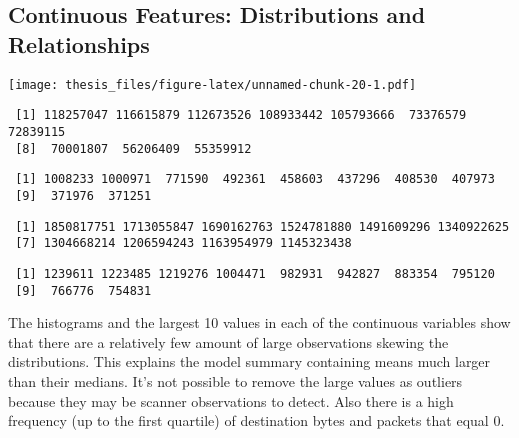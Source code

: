\documentclass[12pt,twoside]{dukestatscithesis}
\theoremstyle{definition}
\theoremstyle{definition}
\theoremstyle{definition}
\theoremstyle{remark}
\begin{document}
\subsection{Continuous Features: Distributions and
Relationships}\label{continuous-features-distributions-and-relationships}

\texttt{[image: thesis\_files/figure-latex/unnamed-chunk-20-1.pdf]}
\begin{verbatim}
 [1] 118257047 116615879 112673526 108933442 105793666  73376579  72839115
 [8]  70001807  56206409  55359912
\end{verbatim}
\begin{verbatim}
 [1] 1008233 1000971  771590  492361  458603  437296  408530  407973
 [9]  371976  371251
\end{verbatim}
\begin{verbatim}
 [1] 1850817751 1713055847 1690162763 1524781880 1491609296 1340922625
 [7] 1304668214 1206594243 1163954979 1145323438
\end{verbatim}
\begin{verbatim}
 [1] 1239611 1223485 1219276 1004471  982931  942827  883354  795120
 [9]  766776  754831
\end{verbatim}
The histograms and the largest 10 values in each of the continuous
variables show that there are a relatively few amount of large
observations skewing the distributions. This explains the model summary
containing means much larger than their medians. It's not possible to
remove the large values as outliers because they may be scanner
observations to detect. Also there is a high frequency (up to the first
quartile) of destination bytes and packets that equal 0.
\end{document}
